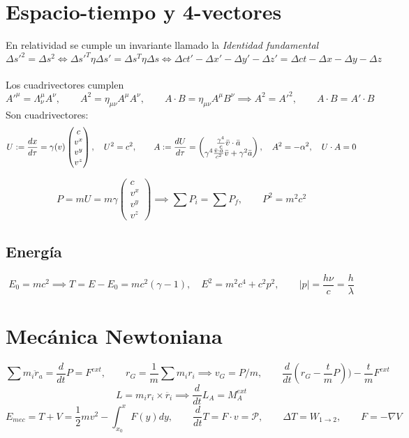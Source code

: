 \documentclass{myclass}
\newcommand{\1}{\tikz[baseline=(char.base)]{
            \node[shape=circle,draw,inner sep=1pt] (char) {1};}}
\newcommand{\2}{\tikz[baseline=(char.base)]{
            \node[shape=circle,draw,inner sep=1pt] (char) {2};}}
\newcommand{\dt}{\frac{d}{dt}}
\begin{document}
\section{Espacio-tiempo y 4-vectores}
En relatividad se cumple un invariante llamado la \textit{Identidad fundamental}
$$
\Delta s'^2 = \Delta s^2 \iff \Delta s'^T \eta \Delta s' = \Delta s^T \eta \Delta s \iff \Delta ct' - \Delta x'- \Delta y'- \Delta z' = \Delta ct - \Delta x- \Delta y- \Delta z
$$
\\
Los cuadrivectores cumplen
$$A'^\mu = \Lambda^\mu_\nu A^\nu, \qquad A^2 = \eta_{\mu\nu}A^{\mu}A^\nu, \qquad A\cdot B = \eta_{\mu\nu}A^{\mu}B^\nu \implies A^2 = A'^2, \qquad A\cdot B = A'\cdot B $$
Son cuadrivectores:
$$
U:=\frac{dx}{d\tau} = \gamma(v)\begin{pmatrix}
c\\
v^x \\
v^y\\
v^z
\end{pmatrix}, \quad U^2 = c^2, \qquad A:=\frac{dU}{d\tau} = \begin{pmatrix}
\frac{\gamma^4}{c}\Bar{v}\cdot \Bar{a}\\
\gamma^4\frac{\Bar{v}\cdot\Bar{a}}{c^2}\Bar{v} + \gamma^2\Bar{a} \\
\end{pmatrix}, \quad A^2 = -\alpha^2, \quad U\cdot A =0
$$

$$
P =  mU = m\gamma\begin{pmatrix}
c\\
v^x \\
v^y\\
v^z
\end{pmatrix} \implies \sum P_i = \sum P_f, \qquad P^2=m^2c^2
$$
\subsection{Energía}
$$
E_0=mc^2 \implies T = E-E_0 = mc^2(\gamma - 1), \quad E^2 = m^2c^4 + c^2p^2, \qquad |p|=\frac{h\nu}{c} = \frac{h}{\lambda}
$$
\section{Mecánica Newtoniana}
$$
\sum m_i\ddot{r}_a = \frac{d}{dt} P = F^{ext}, \qquad r_G = \frac{1}{m}\sum m_ir_i \implies v_G = P/m, \qquad \dt (r_G - \frac{t}{m}P) ) -\frac{t}{m} F^{ext}
$$
$$
L = m_ir_i\times \ddot{r_i} \implies \dt L_A = M_A^{ext}
$$
$$
E_{mec} = T+V = \frac{1}{2}mv^2 - \int_{x_0}^{x}F(y)dy, \qquad \dt T = F\cdot v=\mathcal{P}, \qquad \Delta T = W_{1\to 2}, \qquad F = -\nabla V
$$
\end{document}
